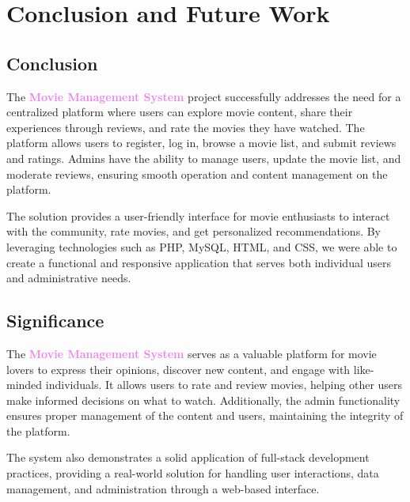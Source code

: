 \documentclass[a4paper,12pt]{article}  %
\renewcommand{\textbf}[1]{\textcolor{violet}{\bfseries #1}}
\begin{document}
\clearpage




\section{Conclusion and Future Work} \label{sec:cfw}

\subsection{Conclusion}
The \textbf{Movie Management System} project successfully addresses the need for a centralized platform where users can explore movie content, share their experiences through reviews, and rate the movies they have watched. The platform allows users to register, log in, browse a movie list, and submit reviews and ratings. Admins have the ability to manage users, update the movie list, and moderate reviews, ensuring smooth operation and content management on the platform.

The solution provides a user-friendly interface for movie enthusiasts to interact with the community, rate movies, and get personalized recommendations. By leveraging technologies such as PHP, MySQL, HTML, and CSS, we were able to create a functional and responsive application that serves both individual users and administrative needs.

\subsection{Significance}
The \textbf{Movie Management System} serves as a valuable platform for movie lovers to express their opinions, discover new content, and engage with like-minded individuals. It allows users to rate and review movies, helping other users make informed decisions on what to watch. Additionally, the admin functionality ensures proper management of the content and users, maintaining the integrity of the platform.

The system also demonstrates a solid application of full-stack development practices, providing a real-world solution for handling user interactions, data management, and administration through a web-based interface.
\end{document}
